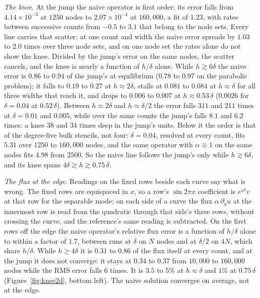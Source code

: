 \documentclass[11pt]{amsart}
\theoremstyle{definition}
\theoremstyle{remark}
\newcommand{\para}[1]{\par\smallskip\noindent\textit{#1}.\enspace}
\newcommand{\sci}[2]{#1 \times 10^{#2}}
\begin{document}
\para{The knee}
At the jump the naive operator is first order: its error falls from
$\sci{4.14}{-3}$ at $1250$ nodes to $\sci{2.07}{-4}$ at $160{,}000$, a fit of
$1.23$, with rates between successive counts from $-0.5$ to $3.1$ that belong
to the node sets. Every line carries that scatter: at one count and width the
naive error spreads by $1.03$ to $2.0$ times over three node sets, and on one
node set the rates alone do not show the knee. Divided by the jump's error on
the same nodes, the scatter cancels, and the knee is nearly a function of
$h/\delta$ alone. While $h \gtrsim 6\delta$ the naive error is $0.86$ to
$0.94$ of the jump's at equilibrium ($0.78$ to $0.97$ on the parabolic
problem); it falls to $0.19$ to $0.27$ at $h \approx 2\delta$, stalls at
$0.081$ to $0.084$ at $h \approx \delta$ for all three widths that reach it,
and drops to $0.006$ to $0.007$ at $h \approx 0.53\,\delta$ ($0.0026$ for
$\delta = 0.04$ at $0.52\,\delta$). Between $h \approx 2\delta$ and
$h \approx \delta/2$ the error falls $311$ and $211$ times at
$\delta = 0.01$ and $0.005$, while over the same counts the jump's falls
$8.1$ and $6.2$ times: a knee $38$ and $34$ times deep in the jump's units.
Below it the order is that of the degree-five bulk stencils, not four:
$\delta = 0.04$, resolved at every count, fits $5.31$ over $1250$ to
$160{,}000$ nodes, and the same operator with $\alpha \equiv 1$ on the same
nodes fits $4.98$ from $2500$. So the naive line follows the jump's only
while $h \gtrsim 6\delta$, and its knee spans
$4\delta \gtrsim h \gtrsim 0.75\,\delta$.

\para{The flux at the edge}
Readings on the fixed rows beside each curve say what is wrong. The fixed
rows are equispaced in $x$, so a row's $\sin 2\pi x$ coefficient is
$e^{\omega t} v$ at that row for the separable mode; on each side of a curve the
flux $\alpha\, \partial_y u$ at the innermost row is read from the quadratic
through that side's three rows, without crossing the curve, and the
reference's same reading is subtracted. On the first rows off the edge the
naive operator's relative flux error is a function of $h/\delta$ alone to
within a factor of $1.7$, between runs at $\delta$ on $N$ nodes and at
$\delta/2$ on $4N$, which share $h/\delta$. While $h \ge 4\delta$ it is
$0.31$ to $0.86$ of the flux itself at every count, and at the jump it does
not converge: it stays at $0.34$ to $0.37$ from $10{,}000$ to $160{,}000$
nodes while the RMS error falls $6$ times. It is $3.5$ to $5\%$ at
$h \approx \delta$ and $1\%$ at $0.75\,\delta$
(Figure~\ref{fig:knee2d}, bottom left). The naive solution converges on
average, not at the edge.
\end{document}
